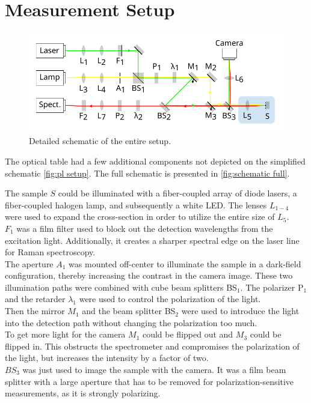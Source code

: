 \documentclass[
	twoside,
	parskip=half,
	a4paper,
]{scrbook}
\begin{document}
\section{Measurement Setup}
\begin{figure}
	\centering
	\includegraphics{../figures/setup.pdf}
	\caption{Detailed schematic of the entire setup.}
	\label{fig:schematic full}
\end{figure}
The optical table had a few additional components not depicted on the simplified schematic \autoref{fig:pl setup}.
The full schematic is presented in \autoref{fig:schematic full}.

The sample $S$ could be illuminated with a fiber-coupled array of diode lasers, a fiber-coupled halogen lamp, and subsequently a white LED.
The lenses $L_{1-4}$ were used to expand the cross-section in order to utilize the entire size of $L_5$. \\
$F_1$ was a film filter used to block out the detection wavelengths from the excitation light.
Additionally, it creates a sharper spectral edge on the laser line for Raman spectroscopy.\\
The aperture $A_1$ was mounted off-center to illuminate the sample in a dark-field configuration, thereby increasing the contrast in the camera image.
These two illumination paths were combined with cube beam splitters BS$_1$.
The polarizer P$_1$ and the retarder $\lambda_1$ were used to control the polarization of the light.\\
Then the mirror $M_1$ and the beam splitter BS$_2$ were used to introduce the light into the detection path without changing the polarization too much.\\
To get more light for the camera $M_1$ could be flipped out and $M_3$ could be flipped in.
This obstructs the spectrometer and compromises the polarization of the light, but increases the intensity by a factor of two.\\
$BS_3$ was just used to image the sample with the camera. 
It was a film beam splitter with a large aperture that has to be removed for polarization-sensitive measurements, as it is strongly polarizing.
\end{document}
